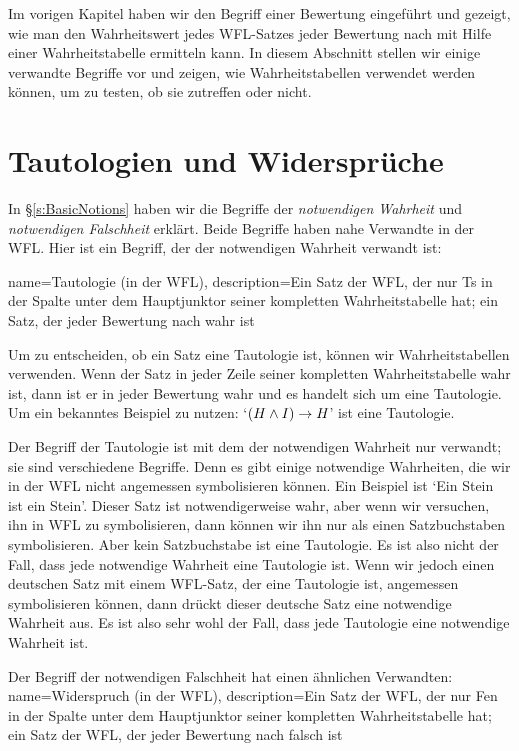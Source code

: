 Im vorigen Kapitel haben wir den Begriff einer Bewertung eingeführt und gezeigt, wie man den Wahrheitswert jedes WFL-Satzes jeder Bewertung nach mit Hilfe einer Wahrheitstabelle ermitteln kann. In diesem Abschnitt stellen wir einige verwandte Begriffe vor und zeigen, wie Wahrheitstabellen verwendet werden können, um zu testen, ob sie zutreffen oder nicht.

\section{Tautologien und Widersprüche}
In \S\ref{s:BasicNotions} haben wir die Begriffe der \emph{notwendigen Wahrheit} und \emph{notwendigen Falschheit} erklärt. Beide Begriffe haben nahe Verwandte in der WFL. Hier ist ein Begriff, der der notwendigen Wahrheit verwandt ist:

{
name=Tautologie (in der WFL),
description={Ein Satz der WFL, der nur Ts in der Spalte unter dem Hauptjunktor seiner kompletten Wahrheitstabelle hat; ein Satz, der jeder \gls{Bewertung} nach wahr ist}
}

Um zu entscheiden, ob ein Satz eine Tautologie ist, können wir Wahrheitstabellen verwenden. Wenn der Satz in jeder Zeile seiner kompletten Wahrheitstabelle wahr ist, dann ist er in jeder Bewertung wahr und es handelt sich um eine Tautologie. Um ein bekanntes Beispiel zu nutzen: `$(H \wedge I) \rightarrow H$' ist eine Tautologie. 

Der Begriff der Tautologie ist mit dem der notwendigen Wahrheit nur verwandt; sie sind verschiedene Begriffe. Denn es gibt einige notwendige Wahrheiten, die wir in der WFL nicht angemessen symbolisieren können. Ein Beispiel ist `Ein Stein ist ein Stein'. Dieser Satz ist notwendigerweise wahr, aber wenn wir versuchen, ihn in WFL zu symbolisieren, dann können wir ihn nur als einen Satzbuchstaben symbolisieren. Aber kein Satzbuchstabe ist eine Tautologie. Es ist also nicht der Fall, dass jede notwendige Wahrheit eine Tautologie ist. Wenn wir jedoch einen deutschen Satz mit einem WFL-Satz, der eine Tautologie ist, angemessen symbolisieren können, dann drückt dieser deutsche Satz eine notwendige Wahrheit aus. Es ist also sehr wohl der Fall, dass jede Tautologie eine notwendige Wahrheit ist.

Der Begriff der notwendigen Falschheit hat einen ähnlichen Verwandten:
{
  name=Widerspruch (in der WFL),
description={Ein Satz der WFL, der nur Fen in der Spalte unter dem Hauptjunktor seiner kompletten Wahrheitstabelle hat; ein Satz der WFL, der jeder \gls{Bewertung} nach falsch ist}
}

